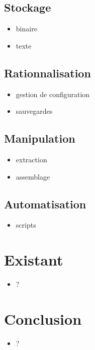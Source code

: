 \documentclass[20pt]{extarticle}
\begin{document}
\subsection{Stockage}
\begin{itemize}
\item{binaire}
\item{texte}
\end{itemize}

\subsection{Rationnalisation}
\begin{itemize}
\item{gestion de configuration}
\item{sauvegardes}
\end{itemize}

\subsection{Manipulation}
\begin{itemize}
\item{extraction}
\item{assemblage}
\end{itemize}

\subsection{Automatisation}
\begin{itemize}
\item{scripts}
\end{itemize}

\pagebreak
\section{Existant}

\begin{itemize}
\item{?}
\end{itemize}

\pagebreak
\section{Conclusion}

\begin{itemize}
\item{?}
\end{itemize}

\pagebreak
\end{document}
